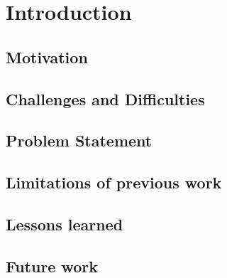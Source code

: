 

    \chapter{Introduction}

    \section{Motivation}


    \section{Challenges and Difficulties}



    \section{Problem Statement}

    
    \section{Limitations of previous work}

    
    \section{Lessons learned}

    \section{Future work} 

